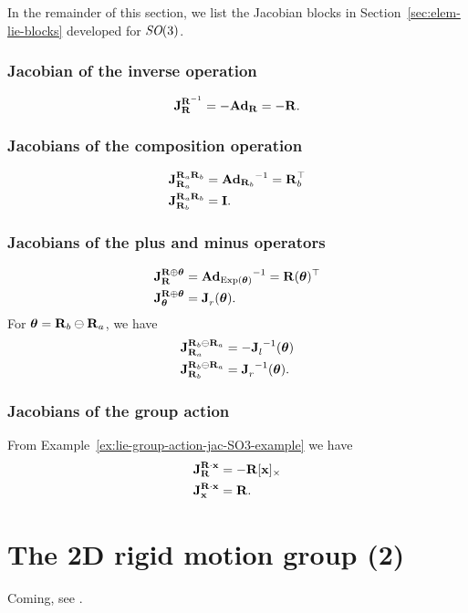 In the remainder of this section, we list the Jacobian blocks in Section~\ref{sec:elem-lie-blocks} developed for $\SO(3)$.

\subsubsection*{Jacobian of the inverse operation}
\begin{equation}
  \jac{\matR^{-1}}{\matR} = -\mAd_\matR = -\matR.
\end{equation}

\subsubsection*{Jacobians of the composition operation}
\begin{align}
  \jac{\matR_a \matR_b}{\matR_a} &= {\mAd_{\matR_b}}^{-1} = \matR_b\trans\\
  \jac{\matR_a \matR_b}{\matR_b} &= \matI.
\end{align}

\subsubsection*{Jacobians of the plus and minus operators}
\begin{align}
  \jac{\matR \oplus \vectheta}{\matR} &= {\mAd_{\Exp(\vectheta)}}^{-1} = \matR(\vectheta)\trans\\
  \jac{\matR \oplus \vectheta}{\vectheta} &= \jac{}{r}(\vectheta).
\end{align}
For $\vectheta = \matR_b \ominus \matR_a$, we have
\begin{align}
  \jac{\matR_b \ominus \matR_a}{\matR_a} &= -\jac{}{l}^{-1}(\vectheta)\\
  \jac{\matR_b \ominus \matR_a}{\matR_b} &= \jac{}{r}^{-1}(\vectheta).
\end{align}

\subsubsection*{Jacobians of the group action}
From Example~\ref{ex:lie-group-action-jac-SO3-example} we have
\begin{align}
  \jac{\matR \cdot \vecx}{\matR} &= -\matR [\vecx]_\times\\
  \jac{\matR \cdot \vecx}{\vecx} &= \matR.
\end{align}

\section{The 2D rigid motion group \SE(2)} \label{sec:SE2_group}
Coming, see \cite{SolaARobotics}.

